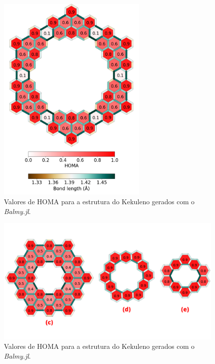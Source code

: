 \begin{figure}[htb]
\caption{\label{fig:HOMA} Valores de HOMA para a estrutura do Kekuleno gerados com o \textit{Balmy.jl}.}
	\begin{center}
		\includegraphics[width=0.65\textwidth]{images/geom.png}
	\end{center}
\end{figure}

\begin{figure}[htb]
\caption{\label{fig:HOMA2} Valores de HOMA para a estrutura do Kekuleno gerados com o \textit{Balmy.jl}.}
	\begin{center}
		\includegraphics[width=1.0\textwidth]{images/15.png}
	\end{center}
\end{figure}

